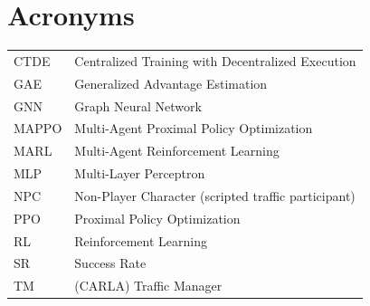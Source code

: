 \documentclass[12pt,a4paper,oneside]{report}
\begin{document}
\tableofcontents

\chapter*{Acronyms}
\begin{tabular}{ll}
CTDE  & Centralized Training with Decentralized Execution \\
GAE   & Generalized Advantage Estimation \\
GNN   & Graph Neural Network \\
MAPPO & Multi-Agent Proximal Policy Optimization \\
MARL  & Multi-Agent Reinforcement Learning \\
MLP   & Multi-Layer Perceptron \\
NPC   & Non-Player Character (scripted traffic participant) \\
PPO   & Proximal Policy Optimization \\
RL    & Reinforcement Learning \\
SR    & Success Rate \\
TM    & (CARLA) Traffic Manager \\
\end{tabular}









\appendix


\printbibliography[heading=bibintoc]
\end{document}
